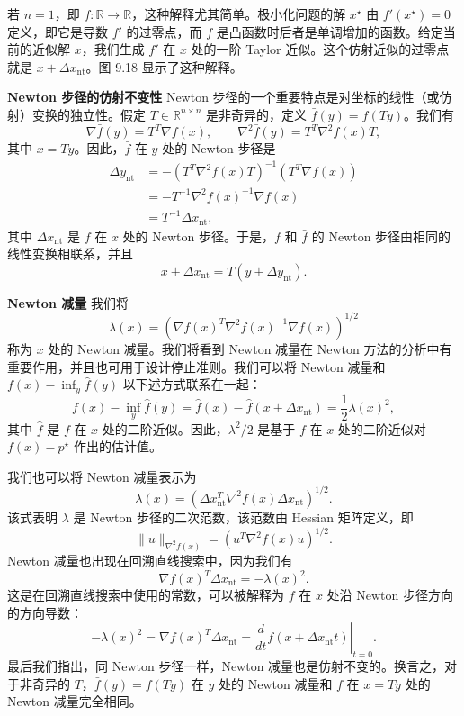 \documentclass[UTF8,12pt,a4paper,fontset=fandol]{ctexart}
\begin{document}
若 $n=1$，即 $f:\mathbb{R}\to\mathbb{R}$，这种解释尤其简单。极小化问题的解 $x^\star$ 由 $f'(x^\star)=0$ 定义，即它是导数 $f'$ 的过零点，而 $f$ 是凸函数时后者是单调增加的函数。给定当前的近似解 $x$，我们生成 $f'$ 在 $x$ 处的一阶 Taylor 近似。这个仿射近似的过零点就是 $x+\Delta x_{\mathrm{nt}}$。图 9.18 显示了这种解释。

\noindent\textbf{Newton 步径的仿射不变性}\quad
Newton 步径的一个重要特点是对坐标的线性（或仿射）变换的独立性。假定
$T\in\mathbb{R}^{n\times n}$ 是非奇异的，定义 $\bar{f}(y)=f(Ty)$。我们有
\[
\nabla\bar{f}(y)=T^T\nabla f(x),\qquad \nabla^2\bar{f}(y)=T^T\nabla^2f(x)T,
\]
其中 $x=Ty$。因此，$\bar{f}$ 在 $y$ 处的 Newton 步径是
\[
\begin{aligned}
\Delta y_{\mathrm{nt}}
&=-(T^T\nabla^2f(x)T)^{-1}(T^T\nabla f(x))\\
&=-T^{-1}\nabla^2f(x)^{-1}\nabla f(x)\\
&=T^{-1}\Delta x_{\mathrm{nt}},
\end{aligned}
\]
其中 $\Delta x_{\mathrm{nt}}$ 是 $f$ 在 $x$ 处的 Newton 步径。于是，$f$ 和 $\bar{f}$ 的 Newton 步径由相同的线性变换相联系，并且
\[
x+\Delta x_{\mathrm{nt}}=T(y+\Delta y_{\mathrm{nt}}).
\]

\noindent\textbf{Newton 减量}\quad
我们将
\[
\lambda(x)=\left(\nabla f(x)^T\nabla^2 f(x)^{-1}\nabla f(x)\right)^{1/2}
\]
称为 $x$ 处的 Newton 减量。我们将看到 Newton 减量在 Newton 方法的分析中有重要作用，并且也可用于设计停止准则。我们可以将 Newton 减量和 $f(x)-\inf_y\hat{f}(y)$ 以下述方式联系在一起：
\[
f(x)-\inf_y\hat{f}(y)=\hat{f}(x)-\hat{f}(x+\Delta x_{\mathrm{nt}})=\frac{1}{2}\lambda(x)^2,
\]
其中 $\hat{f}$ 是 $f$ 在 $x$ 处的二阶近似。因此，$\lambda^2/2$ 是基于 $f$ 在 $x$ 处的二阶近似对 $f(x)-p^\star$ 作出的估计值。

我们也可以将 Newton 减量表示为
\begin{equation}
\lambda(x)=\left(\Delta x_{\mathrm{nt}}^T\nabla^2f(x)\Delta x_{\mathrm{nt}}\right)^{1/2}.
\tag{9.29}
\end{equation}
该式表明 $\lambda$ 是 Newton 步径的二次范数，该范数由 Hessian 矩阵定义，即
\[
\|u\|_{\nabla^2 f(x)}=(u^T\nabla^2f(x)u)^{1/2}.
\]
Newton 减量也出现在回溯直线搜索中，因为我们有
\begin{equation}
\nabla f(x)^T\Delta x_{\mathrm{nt}}=-\lambda(x)^2.
\tag{9.30}
\end{equation}
这是在回溯直线搜索中使用的常数，可以被解释为 $f$ 在 $x$ 处沿 Newton 步径方向的方向导数：
\[
-\lambda(x)^2=\nabla f(x)^T\Delta x_{\mathrm{nt}}=\left.\frac{d}{dt}f(x+\Delta x_{\mathrm{nt}}t)\right|_{t=0}.
\]
最后我们指出，同 Newton 步径一样，Newton 减量也是仿射不变的。换言之，对于非奇异的 $T$，$\bar{f}(y)=f(Ty)$ 在 $y$ 处的 Newton 减量和 $f$ 在 $x=Ty$ 处的 Newton 减量完全相同。
\end{document}
